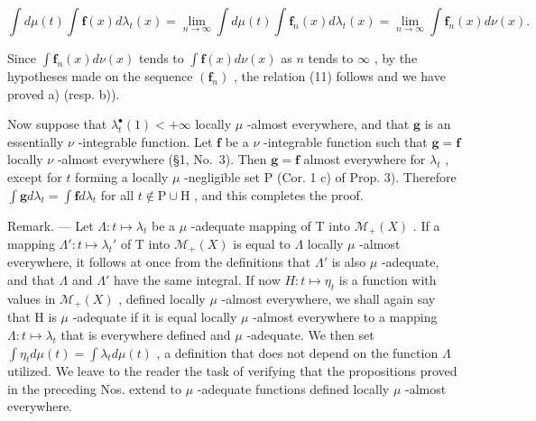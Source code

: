 \[
\int d \mu (t) \int \mathbf {f} (x) d \lambda_ {t} (x) = \lim _ {n \rightarrow \infty} \int d \mu (t) \int \mathbf {f} _ {n} (x) d \lambda_ {t} (x) = \lim _ {n \rightarrow \infty} \int \mathbf {f} _ {n} (x) d \nu (x).
\]

Since \(\int \mathbf{f}_n(x) d\nu(x)\) tends to \(\int \mathbf{f}(x) d\nu(x)\) as \(n\) tends to \(\infty\) , by the hypotheses made on the sequence \((\mathbf{f}_n)\) , the relation (11) follows and we have proved a) (resp. b)).

Now suppose that \(\lambda_t^\bullet(1) < +\infty\) locally \(\mu\) -almost everywhere, and that \(\mathbf{g}\) is an essentially \(\nu\) -integrable function. Let \(\mathbf{f}\) be a \(\nu\) -integrable function such that \(\mathbf{g} = \mathbf{f}\) locally \(\nu\) -almost everywhere (§1, No.~3). Then \(\mathbf{g} = \mathbf{f}\) almost everywhere for \(\lambda_t\) , except for \(t\) forming a locally \(\mu\) -negligible set \(\mathrm{P}\) (Cor. 1 c) of Prop. 3). Therefore \(\int \mathbf{g} d\lambda_t = \int \mathbf{f} d\lambda_t\) for all \(t \notin \mathrm{P} \cup \mathrm{H}\) , and this completes the proof.

Remark. --- Let \(\Lambda: t \mapsto \lambda_{t}\) be a \(\mu\) -adequate mapping of T into \(\mathcal{M}_{+}(X)\) . If a mapping \(\Lambda': t \mapsto \lambda_{t}'\) of T into \(\mathcal{M}_{+}(X)\) is equal to \(\Lambda\) locally \(\mu\) -almost everywhere, it follows at once from the definitions that \(\Lambda'\) is also \(\mu\) -adequate, and that \(\Lambda\) and \(\Lambda'\) have the same integral. If now \(H: t \mapsto \eta_{t}\) is a function with values in \(\mathcal{M}_{+}(X)\) , defined locally \(\mu\) -almost everywhere, we shall again say that H is \(\mu\) -adequate if it is equal locally \(\mu\) -almost everywhere to a mapping \(\Lambda: t \mapsto \lambda_{t}\) that is everywhere defined and \(\mu\) -adequate. We then set \(\int \eta_{t} d\mu(t) = \int \lambda_{t} d\mu(t)\) , a definition that does not depend on the function \(\Lambda\) utilized. We leave to the reader the task of verifying that the propositions proved in the preceding Nos. extend to \(\mu\) -adequate functions defined locally \(\mu\) -almost everywhere.

